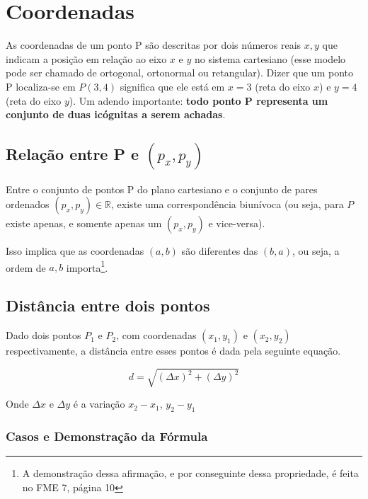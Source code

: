 \documentclass[11pt]{memoir}
\begin{document}
\chapter{Coordenadas}

As coordenadas de um ponto P são descritas por dois números reais $x, y$ que indicam a posição em relação ao eixo $x$ e $y$ no sistema cartesiano (esse modelo pode ser chamado de ortogonal, ortonormal ou retangular). Dizer que um ponto P localiza-se em $P(3, 4)$ significa que ele está em $x = 3$ (reta do eixo $x$) e $y = 4$ (reta do eixo $y$). Um adendo importante: \textbf{todo ponto P representa um conjunto de duas icógnitas a serem achadas}.

\section{Relação entre P e $(p_{x}, p_{y})$}


\begin{tcolorbox}[colback=LightYellow]
  Entre o conjunto de pontos P do plano cartesiano e o conjunto de pares ordenados $(p_{x}, p_{y}) \in \mathbb{R}$, existe uma correspondência biunívoca (ou seja, para $P$ existe apenas, e somente apenas um $(p_{x}, p_{y})$ e vice-versa).
\end{tcolorbox}

Isso implica que as coordenadas $(a, b)$ são diferentes das $(b, a)$, ou seja, a ordem de $a, b$ importa\footnote{A demonstração dessa afirmação, e por conseguinte dessa propriedade, é feita no FME 7, página 10}.

\section{Distância entre dois pontos}

\begin{tcolorbox}[colback=LightYellow]
  Dado dois pontos $P_{1}$ e $P_{2}$, com coordenadas $(x_{1}, y_{1})$ e $(x_{2}, y_{2})$ respectivamente, a distância entre esses pontos é dada pela seguinte equação.

  \begin{equation} \label{eq:d}
    d = \sqrt{(\Delta x)^{2} + (\Delta y)^{2}}
  \end{equation}

  Onde $\Delta x$ e $\Delta y$ é a variação $x_{2} - x_{1}$, $y_{2} - y_{1}$
\end{tcolorbox}

\subsection{Casos e Demonstração da Fórmula}
\end{document}
